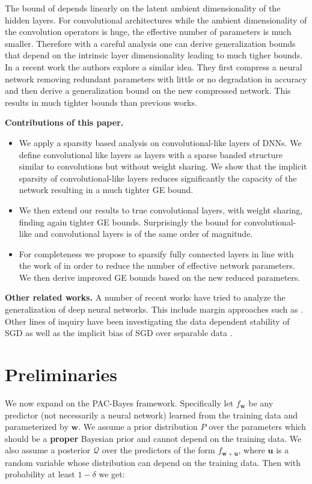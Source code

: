 \documentclass{article} %
\theoremstyle{definition}
\begin{document}
The bound of \citet{neyshabur2017pac} depends linearly on the latent ambient dimensionality of the hidden layers. For convolutional architectures while the ambient dimensionality of the convolution operators is huge, the effective number of parameters is much smaller. Therefore with a careful analysis one can derive generalization bounds that depend on the intrinsic layer dimensionality leading to much tigher bounds. In a recent work \citet{arora2018stronger} the authors explore a similar idea. They first compress a neural network removing redundant parameters with little or no degradation in accuracy and then derive a generalization bound on the new compressed network. This results in much tighter bounds than previous works.

\textbf{Contributions of this paper.}
\begin{itemize}
\item We apply a sparsity based analysis on convolutional-like layers of DNNs. We define convolutional like layers as layers with a sparse banded structure similar to convolutions but without weight sharing. We show that the implicit sparsity of convolutional-like layers reduces significantly the capacity of the network resulting in a much tighter GE bound. 
\item We then extend our results to true convolutional layers, with weight sharing, finding again tighter GE bounds. Surprisingly the bound for convolutional-like and convolutional layers is of the same order of magnitude. %
\item For completeness we propose to sparsify fully connected layers in line with the work of \citet{arora2018stronger} in order to reduce the number of effective network parameters. We then derive improved GE bounds based on the new reduced parameters. 
\end{itemize}

\textbf{Other related works.}
A number of recent works have tried to analyze the generalization of deep neural networks. This include margin approaches such as \citet{sokolic2016robust} \citet{bartlett2017spectrally}. Other lines of inquiry have been investigating the data dependent stability of SGD \citet{kuzborskij2017data} as well as the implicit bias of SGD over separable data \citet{soudry2017implicit} \citet{neyshabur2017geometry}.

\section{Preliminaries}
We now expand on the PAC-Bayes framework. Specifically let $f_{\boldsymbol{w}}$ be any predictor (not necessarily a neural network) learned from the training data and parameterized by $\boldsymbol{w}$. We assume a prior distribution $P$ over the parameters which should be a \textbf{proper} Bayesian prior and cannot depend on the training data. We also assume a posterior $\mathcal{Q}$ over the predictors of the form $f_{\boldsymbol{w}+\boldsymbol{u}}$, where $\boldsymbol{u}$ is a random variable whose distribution can depend on the training data.  Then with probability at least $1-\delta$ we get:
\end{document}
